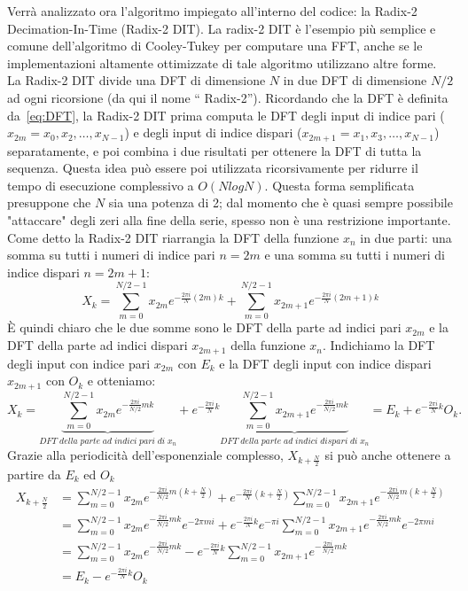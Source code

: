\documentclass[a4paper, 12pt]{book}
\begin{document}
Verrà analizzato ora l'algoritmo impiegato all'interno del codice: la Radix-2 Decimation-In-Time (Radix-2 DIT).
La radix-2 DIT è l’esempio più semplice e comune dell'algoritmo di Cooley-Tukey per computare una FFT, anche se le implementazioni altamente ottimizzate di tale algoritmo utilizzano altre forme.
La Radix-2 DIT divide una DFT di dimensione $N$ in due DFT di dimensione $N/2$ ad ogni ricorsione (da qui il nome “ Radix-2”).
Ricordando che la DFT è definita da~\ref{eq:DFT}, la Radix-2 DIT prima computa le DFT degli input di indice pari ($x_{2m}=x_0 , x_2 ,\ldots , x_{N-1}$) e degli input di indice dispari ($x_{2m+1}= x_1 , x_3 ,\ldots , x_{N-1}$) separatamente, e poi combina i due risultati per ottenere la DFT di tutta la sequenza.
Questa idea può essere poi utilizzata ricorsivamente per ridurre il tempo di esecuzione complessivo a $O(N log N)$.
Questa forma semplificata presuppone che $N$ sia una potenza di 2; dal momento che è quasi sempre possibile "attaccare" degli zeri alla fine della serie, spesso non è una restrizione importante.
Come detto la Radix-2 DIT riarrangia la DFT della funzione $x_n$ in due parti: una somma su tutti i numeri di indice pari $n=2m$ e una somma su tutti i numeri di indice dispari $n=2m+1$:
\begin{equation}
	X_k=\sum_{m=0}^{N/2-1} x_{2m} e^{-\frac{2\pi i}{N} (2m)k} + \sum_{m=0}^{N/2-1} 				x_{2m+1} e^{-\frac{2 \pi i}{N} (2m+1)k}
\end{equation}
È quindi chiaro che le due somme sono le DFT della parte ad indici pari $x_{2m}$ e la DFT della parte ad indici dispari $x_{2m+1}$ della funzione $x_n$.
Indichiamo la DFT degli input con indice pari $x_{2m}$ con $E_k$ e la DFT degli input con indice dispari $x_{2m+1}$ con $O_k$ e otteniamo:
\begin{equation}
	X_k=\underbrace{\sum_{m=0}^{N/2-1} x_{2m} e^{-\frac{2 \pi i}{N/2}mk}}_{DFT\; della			\; parte\; ad\; indici\; pari\; di\; x_n} + e^{-\frac{2 \pi i}{N}k} 						\underbrace{\sum_{m=0}^{N/2-1} x_{2m+1}e^{-\frac{2 \pi i}{N/2}mk}}_{DFT\; della\; 			parte\; ad\; indici\; dispari\; di\; x_n} = E_k + e^{-\frac{2 \pi i}{N}k} O_k .
\end{equation}
Grazie alla periodicità dell’esponenziale complesso, $X_{k+\frac{N}{2}}$ si può anche ottenere a partire da $E_k$ ed $O_k$
\begin{align}
	X_{k+\frac{N}{2}} &= \sum_{m=0}^{N/2-1} x_{2m} e^{-\frac{2 \pi i}{N/2}m(k+\frac{N}			{2})} + e^{-\frac{2 \pi i}{N}(k+\frac{N}{2})} \sum_{m=0}^{N/2-1}  x_{2m+1} e^{-				\frac{2 \pi i}{N/2}m(k+\frac{N}{2})} \\
	&=\sum_{m=0}^{N/2-1} x_{2m} e^{-\frac{2 \pi i}{N/2}mk} e^{-2 \pi mi} + e^{-\frac{2 			\pi i}{N}k} e^{-\pi i} \sum_{m=0}^{N/2-1} x_{2m+1} e^{-\frac{2\pi i}{N/2} mk} e^{-2 	\pi mi} \\
	&=\sum_{m=0}^{N/2-1} x_{2m} e^{-\frac{2 \pi i}{N/2}mk} - e^{-\frac{2 \pi i}{N}k} 			\sum_{m=0}^{N/2-1} x_{2m+1} e^{-\frac{2\pi i}{N/2} mk} \\
	&=E_k - e^{-\frac{2 \pi i}{N}k} O_k
\end{align}
\end{document}
